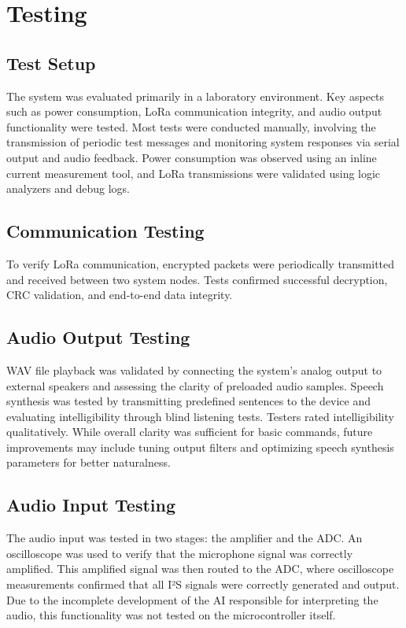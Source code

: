 \documentclass[conference]{IEEEtran}
\begin{document}




\section{Testing}

\subsection{Test Setup}
The system was evaluated primarily in a laboratory environment. Key aspects such as power consumption, LoRa communication integrity, and audio output functionality were tested. Most tests were conducted manually, involving the transmission of periodic test messages and monitoring system responses via serial output and audio feedback. Power consumption was observed using an inline current measurement tool, and LoRa transmissions were validated using logic analyzers and debug logs.

\subsection{Communication Testing}
To verify LoRa communication, encrypted packets were periodically transmitted and received between two system nodes. Tests confirmed successful decryption, CRC validation, and end-to-end data integrity.

\subsection{Audio Output Testing}
WAV file playback was validated by connecting the system's analog output to external speakers and assessing the clarity of preloaded audio samples. Speech synthesis was tested by transmitting predefined sentences to the device and evaluating intelligibility through blind listening tests. Testers rated intelligibility qualitatively. While overall clarity was sufficient for basic commands, future improvements may include tuning output filters and optimizing speech synthesis parameters for better naturalness.

\subsection{Audio Input Testing}

The audio input was tested in two stages: the amplifier and the ADC.
An oscilloscope was used to verify that the microphone signal was correctly amplified.
This amplified signal was then routed to the ADC, where oscilloscope measurements confirmed that all I²S signals were correctly generated and output.
Due to the incomplete development of the AI responsible for interpreting the audio, this functionality was not tested on the microcontroller itself.
\end{document}

